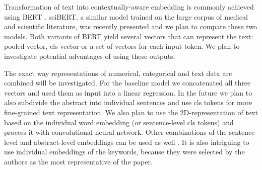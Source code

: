 \documentclass[11pt]{article}
\begin{document}
Transformation of text into contextually-aware embedding is commonly achieved using BERT \citep{DBLP:journals/corr/abs-1810-04805}. sciBERT, a similar model trained on the large corpus of medical and scientific literature, was recently presented \citep{DBLP:journals/corr/abs-1903-10676} and we plan to compare these two models. Both variants of BERT yield several vectors that can represent the text: pooled vector, cls vector or a set of vectors for each input token. We plan to investigate potential advantages of using these outputs. 

The exact way representations of numerical, categorical and text data are combined will be investigated. For the baseline model we concatenated all three vectors and used them as input into a linear regression. In the future we plan to also subdivide the abstract into individual sentences and use cls tokens for more fine-grained text representation. We also plan to use the 2D-representation of text based on the individual word embedding (or sentence-level cls tokens) and process it with convolutional  neural network. Other combinations of the sentence-level and abstract-level embeddings can be used as well \citep{hs2022}. It is also intriguing to use individual embeddings of the keywords, because they were selected by the authors as the most representative of the paper.
\end{document}
